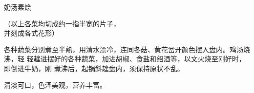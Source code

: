 %
%
%
%
%
%
%
\begin{recipe}{奶汤素烩}

\ingredients

{\kafamily\null\hspace{4em}（以上各菜均切成约一指半宽的片子，\\
 \null\hspace{5em}并刻成各式花形）\\}

\preparation

各种蔬菜分别煮至半熟，用清水漂冷，连同冬菇、黄花岔开颜色摆入盘内。鸡汤烧沸，轻
轻趖进摆好的各种蔬菜，加进胡椒、食盐和绍酒等，以文火烧至刚好时，即倒进牛奶，刚
煮沸后，起锅斜趖盘内，须保持原状不乱。

\features

清淡可口，色泽美观，营养丰富。

\end{recipe}

